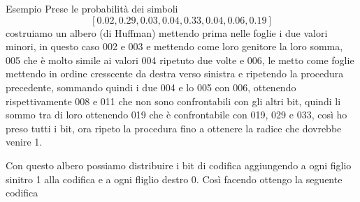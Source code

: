 \documentclass{article}
\begin{document}
Esempio
Prese le probabilità dei simboli
\[[0.02,0.29,0.03,0.04,0.33,0.04,0.06,0.19]\]
costruiamo un albero (di Huffman) mettendo prima nelle foglie i due valori minori, in questo caso 002 e 003 e mettendo come loro genitore la loro somma, 005 che è molto simile ai valori 004 ripetuto due volte e 006, le metto come foglie mettendo in ordine cresscente da destra verso sinistra e ripetendo la procedura precedente, sommando quindi i due 004 e lo 005 con 006, ottenendo rispettivamente 008 e 011 che non sono confrontabili con gli altri bit, quindi li sommo tra di loro ottenendo 019 che è confrontabile con 019, 029 e 033, così ho preso tutti i bit, ora ripeto la procedura fino a ottenere la radice che dovrebbe venire 1.
\begin{center}
\end{center}
Con questo albero possiamo distribuire i bit di codifica aggiungendo a ogni figlio sinitro 1 alla codifica e a ogni fliglio destro 0. Così facendo ottengo la seguente codifica
\end{document}
